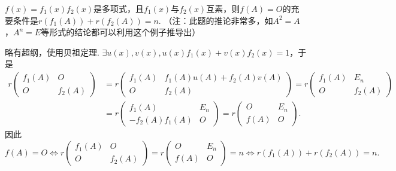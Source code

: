 \begin{exercise}
\begin{exgroup}
        \item $f(x)=f_1(x)f_2(x)$是多项式，且$f_1(x)$与$f_2(x)$互素，则$f(A)=O$的充要条件是$r(f_1(A))+r(f_2(A))=n$. （注：此题的推论非常多，如$A^2=A$，$A^n=E$等形式的结论都可以利用这个例子推导出）
        \begin{answer}
            略有超纲，使用贝祖定理. $\exists u(x),v(x),u(x)f_1(x)+v(x)f_2(x)=1 $，于是
            \begin{align*}
                r\begin{pmatrix}
                    f_1(A) & O      \\
                    O      & f_2(A)
                \end{pmatrix}
                &= r\begin{pmatrix}
                        f_1(A) & f_1(A)u(A)+f_2(A)v(A) \\
                        O      & f_2(A)
                    \end{pmatrix} = r\begin{pmatrix}
                        f_1(A) & E_n    \\
                        O      & f_2(A)
                    \end{pmatrix} \\
                &= r\begin{pmatrix}
                        f_1(A)        & E_n \\
                        -f_2(A)f_1(A) & O
                    \end{pmatrix} = r\begin{pmatrix}
                        O    & E_n \\
                        f(A) & O
                    \end{pmatrix}.
            \end{align*}
            因此
            \[
                f(A) = O \iff
                r\begin{pmatrix}
                    f_1(A) & O      \\
                    O      & f_2(A)
                \end{pmatrix} = r\begin{pmatrix}
                    O    & E_n \\
                    f(A) & O
                \end{pmatrix} = n \iff
                r(f_1(A)) + r(f_2(A)) = n.
            \]
        \end{answer}


\end{exgroup}
\end{exercise}
